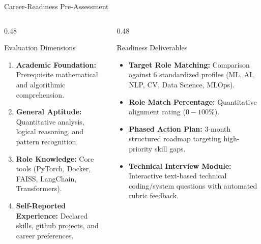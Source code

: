 \documentclass[aspectratio=169,10pt]{beamer}
\begin{document}
\begin{frame}{Career-Readiness Pre-Assessment}
  \begin{columns}[T]
    \begin{column}{0.48\textwidth}
      \begin{block}{Evaluation Dimensions}
        \begin{enumerate}
          \item \textbf{Academic Foundation:} Prerequisite mathematical and algorithmic comprehension.
          \item \textbf{General Aptitude:} Quantitative analysis, logical reasoning, and pattern recognition.
          \item \textbf{Role Knowledge:} Core tools (PyTorch, Docker, FAISS, LangChain, Transformers).
          \item \textbf{Self-Reported Experience:} Declared skills, github projects, and career preferences.
        \end{enumerate}
      \end{block}
    \end{column}
    \begin{column}{0.48\textwidth}
      \begin{block}{Readiness Deliverables}
        \begin{itemize}
          \item \textbf{Target Role Matching:} Comparison against 6 standardized profiles (ML, AI, NLP, CV, Data Science, MLOps).
          \item \textbf{Role Match Percentage:} Quantitative alignment rating ($0-100\%$).
          \item \textbf{Phased Action Plan:} 3-month structured roadmap targeting high-priority skill gaps.
          \item \textbf{Technical Interview Module:} Interactive text-based technical coding/system questions with automated rubric feedback.
        \end{itemize}
      \end{block}
    \end{column}
  \end{columns}
\end{frame}
\end{document}
